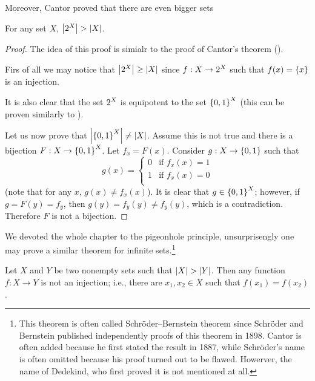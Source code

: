 Moreover, Cantor proved that there are even bigger sets
\begin{theorem}
  For any set $X$, $\cardinality{\subsets{X}} > \cardinality{X}$.
\end{theorem}
\begin{proof}
  The idea of this proof is simialr to the proof of Cantor's theorem
  (). 
  
  Firs of all we may notice that $\cardinality{\subsets{X}} \ge \cardinality{X}$
  since $f : X \to \subsets{X}$ such that $f(x) = \set{x}$ is an injection.
  
  It is also clear that the set $\subsets{X}$ is equipotent to the set
  $\functions{X}{\set{0, 1}}$ (this can be proven similarly to
  ).

  Let us now prove that $\cardinality{\functions{X}{\set{0, 1}}} \neq
  \cardinality{X}$. Assume this is not true and
  there is a bijection $F : X \to \functions{X}{\set{0, 1}}$. Let $f_x = F(x)$.
  Consider $g : X \to \set{0, 1}$ such that 
  \[
    g(x) = 
    \begin{cases}
      0 & \text{if } f_x(x) = 1 \\
      1 & \text{if } f_x(x) = 0 \\
    \end{cases}
  \]
  (note that for any $x$, $g(x) \neq f_x(x)$). It is clear that
  $g \in \functions{X}{\set{0, 1}}$; however, if $g = F(y) = f_y$, then $g(y) =
  f_y(y) \neq f_y(y)$, which is a contradiction. Therefore $F$ is not a bijection.
\end{proof}

We devoted the whole chapter to the pigeonhole principle, unsurprisengly one may
prove a similar theorem for infinite sets.\footnote{%
  This theorem is often called Schr\"{o}der--Bernstein theorem since Schr\"{o}der
  and Bernstein published independently proofs of this theorem in 1898. Cantor
  is often added because he first stated the result in 1887, while
  Schr\"{o}der's name is often omitted because his proof turned out to be
  flawed. Howerver, the name of Dedekind, who first proved it is not mentioned
  at all.
}
\begin{theorem}
  Let $X$ and $Y$ be two nonempty sets such that $\left|{X}\right| >
  \left|{Y}\right|$. Then any function $f : X \to Y$ is not an injection; i.e.,
  there are $x_1, x_2 \in X$ such that $f(x_1) = f(x_2)$.
\end{theorem}


